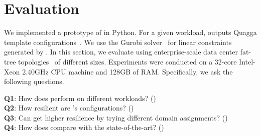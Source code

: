 \begin{figure}
	\begin{center}
	\end{center} 
\end{figure}
\section{Evaluation}
 \label{sec:evaluation}
 We implemented a prototype of \name in Python. 
 For a given workload, \name outputs Quagga template
 configurations~\cite{quagga}. 
 We use the Gurobi solver~\cite{gurobi} 
 for linear constraints generated by \name.
  In this section, we evaluate \Name using
enterprise-scale data
center fat-tree topologies~\cite{fattree} of different 
sizes. Experiments were conducted on a
32-core Intel-Xeon 2.40GHz CPU machine and
128GB of RAM.
Specifically, we ask the following questions.

\vspace{2mm}
\noindent\textbf{Q1}: How does \name perform on different  workloads? ()\\
\noindent\textbf{Q2}: How resilient are \name's  configurations? ()\\
\noindent\textbf{Q3}: Can \name get higher resilience by trying different domain assignments? ()\\
\noindent\textbf{Q4}: How does \name compare with the state-of-the-art? ()




